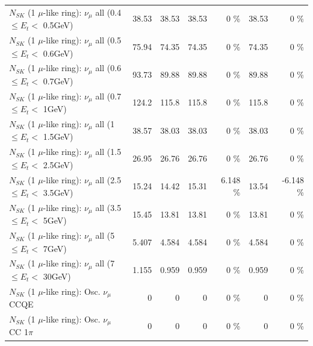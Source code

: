 \begin{table}
\begin{tabular}{| l | r | r | r  r | r  r |}
       $N_{SK}$ (1 $\mu$-like ring): $\nu_{\mu}$ all (0.4 $\leq E_{t} <$ 0.5GeV) &           38.53 &           38.53 &           38.53 &        0 \%  &           38.53 &        0 \%  \\ 
       $N_{SK}$ (1 $\mu$-like ring): $\nu_{\mu}$ all (0.5 $\leq E_{t} <$ 0.6GeV) &           75.94 &           74.35 &           74.35 &        0 \%  &           74.35 &        0 \%  \\ 
       $N_{SK}$ (1 $\mu$-like ring): $\nu_{\mu}$ all (0.6 $\leq E_{t} <$ 0.7GeV) &           93.73 &           89.88 &           89.88 &        0 \%  &           89.88 &        0 \%  \\ 
         $N_{SK}$ (1 $\mu$-like ring): $\nu_{\mu}$ all (0.7 $\leq E_{t} <$ 1GeV) &           124.2 &           115.8 &           115.8 &        0 \%  &           115.8 &        0 \%  \\ 
         $N_{SK}$ (1 $\mu$-like ring): $\nu_{\mu}$ all (1 $\leq E_{t} <$ 1.5GeV) &           38.57 &           38.03 &           38.03 &        0 \%  &           38.03 &        0 \%  \\ 
       $N_{SK}$ (1 $\mu$-like ring): $\nu_{\mu}$ all (1.5 $\leq E_{t} <$ 2.5GeV) &           26.95 &           26.76 &           26.76 &        0 \%  &           26.76 &        0 \%  \\ 
       $N_{SK}$ (1 $\mu$-like ring): $\nu_{\mu}$ all (2.5 $\leq E_{t} <$ 3.5GeV) &           15.24 &           14.42 &           15.31 &    6.148 \%  &           13.54 &   -6.148 \%  \\ 
         $N_{SK}$ (1 $\mu$-like ring): $\nu_{\mu}$ all (3.5 $\leq E_{t} <$ 5GeV) &           15.45 &           13.81 &           13.81 &        0 \%  &           13.81 &        0 \%  \\ 
           $N_{SK}$ (1 $\mu$-like ring): $\nu_{\mu}$ all (5 $\leq E_{t} <$ 7GeV) &           5.407 &           4.584 &           4.584 &        0 \%  &           4.584 &        0 \%  \\ 
          $N_{SK}$ (1 $\mu$-like ring): $\nu_{\mu}$ all (7 $\leq E_{t} <$ 30GeV) &           1.155 &           0.959 &           0.959 &        0 \%  &           0.959 &        0 \%  \\ 
\hline
\hline
                               $N_{SK}$ (1 $\mu$-like ring): Osc. $\nu_\mu$ CCQE &               0 &               0 &               0 &        0 \%  &               0 &        0 \%  \\ 
                          $N_{SK}$ (1 $\mu$-like ring): Osc. $\nu_\mu$ CC 1$\pi$ &               0 &               0 &               0 &        0 \%  &               0 &        0 \%  \\ 

\end{tabular}
\end{table}
